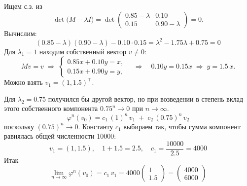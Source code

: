 \documentclass[a4paper]{article}
\renewcommand{\phi}{\varphi}
\begin{document}
\begin{enumerate}
  Ищем с.з. из
  $$
  \det\!\bigl(M-\lambda I\bigr)
  =\det
  \begin{pmatrix}
  0.85-\lambda & 0.10\\[3pt]
  0.15 & 0.90-\lambda
  \end{pmatrix}
  =0.
  $$
  Вычислим:
  $$
  (0.85-\lambda)(0.90-\lambda)-0.10\cdot0.15
  =\lambda^2-1.75\lambda+0.75=0
  $$
  Для $\lambda_1=1$ находим собственный вектор $v\ne0$:
  $$
  M v = v
  \;\Longrightarrow\;
  \begin{cases}
  0.85x+0.10y = x,\\
  0.15x+0.90y = y,
  \end{cases}
  \quad
  \Longrightarrow
  \quad
  0.10y=0.15x
  \;\Longrightarrow\;
  y=1.5\,x.
  $$
  Можно взять $v_1=(1,1.5)^\top$.

  Для $\lambda_2=0.75$ получился бы другой вектор, но при возведении в степень вклад этого собственного компонента $0.75^n\to0$ при $n\to\infty$.
  $$
  \phi^n(v_0)
  = c_1\,(1)^n\,v_1 \;+\;c_2\,(0.75)^n\,v_2
  $$
  поскольку $(0.75)^n\to0$. Константу $c_1$ выбираем так, чтобы сумма компонент равнялась общей численности 10000:
  $$
  v_1=(1,1.5),\quad
  1+1.5=2.5,
  \quad
  c_1=\frac{10000}{2.5}=4000
  $$
  Итак
  $$
  \lim_{n\to\infty}\phi^n(v_0)
  =c_1\,v_1
  =4000\begin{pmatrix}1\\1.5\end{pmatrix}
  =\begin{pmatrix}4000\\6000\end{pmatrix}
  $$


\end{enumerate}
\end{document}
